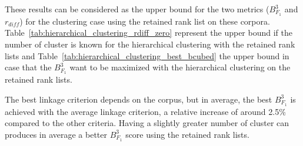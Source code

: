 These results can be considered as the upper bound for the two metrics ($B^3_{F_1}$ and $r_{diff}$) for the clustering case using the retained rank list on these corpora.
Table~\ref{tab:hierarchical_clustering_rdiff_zero} represent the upper bound if the number of cluster is known for the hierarchical clustering with the retained rank lists and Table~\ref{tab:hierarchical_clustering_best_bcubed} the upper bound in case that the $B^3_{F_1}$ want to be maximized with the hierarchical clustering on the retained rank lists.

The best linkage criterion depends on the corpus, but in average, the best $B^3_{F_1}$ is achieved with the average linkage criterion, a relative increase of around 2.5\% compared to the other criteria.
Having a slightly greater number of cluster can produces in average a better $B^3_{F_1}$ score using the retained rank lists.

